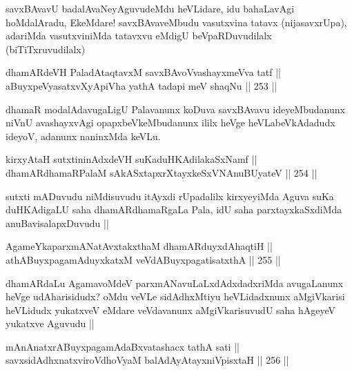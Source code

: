 \begin{artha}
savxBAvavU badalAvaNeyAguvudeMdu heVLidare, idu bahaLavAgi hoMdalAradu, EkeMdare! savxBAvaveMbudu vasutxvina tatavx (nijasavxrUpa), adariMda vasutxviniMda tatavxvu eMdigU beVpaRDuvudilalx (biTiTxruvudilalx)
\end{artha}


\begin{shl}
dhamARdeVH PaladAtaqtavxM savxBAvoV\s vashayxmeVva tatf || \\
aBuyxpeVyasatxvXyA\s piVha yathA tadapi meV shaqNu ||  253 ||  
\end{shl}

\begin{artha}
dhamaR modalAdavugaLigU Palavanunx koDuva savxBAvavu ideyeMbudanunx niVnU avashayxvAgi opapxbeVkeMbudanunx ililx heVge heVLabeVkAdadudx ideyoV, adanunx naninxMda keVLu.
\end{artha}

\begin{shl}
kirxyAtaH sutxtininAdxdeVH suKaduHKAdilakaSxNamf || \\
dhamARdhamaRPalaM sAkASxtapxrXtayxkeSxVNAnuBUyateV ||  254 ||  
\end{shl}

\begin{artha}
sutxti mADuvudu niMdisuvudu itAyxdi rUpadalilx kirxyeyiMda Aguva suKa duHKAdigaLU saha dhamARdhamaRgaLa Pala, idU saha parxtayxkaSxdiMda anuBavisalapxDuvudu ||
\end{artha}

\begin{shl}
AgameYkaparxmANatAvxtakxthaM dhamARduyxdAhaqtiH || \\
athABuyxpagamAduyxkatxM veVdABuyxpagatisatxthA ||  255 ||  
\end{shl}

\begin{artha}
dhamARdaLu AgamavoMdeV parxmANavuLaLxdAdxdadxriMda avugaLanunx heVge udAharisidudx? oMdu veVLe sidAdhxMtiyu heVLidadxnunx aMgiVkarisi heVLidudx yukatxveV eMdare veVdavanunx aMgiVkarisuvudU saha hAgeyeV yukatxve Aguvudu ||
\end{artha}


\begin{shl}
mAnAnatxrABuyxpagamAdaBxvatashacx tathA sati || \\
savxsidAdhxnatxviroVdhoV\s yaM balAdAyAtayxniVpisxtaH ||  256 ||  
\end{shl}

